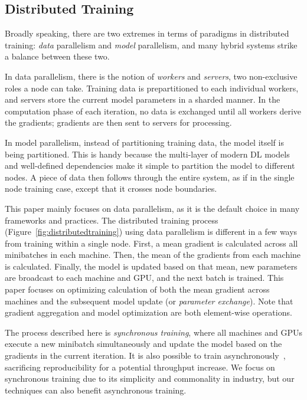 \subsection{Distributed Training}
Broadly speaking, there are two extremes in terms of paradigms in distributed training: \textit{data} parallelism and \textit{model} parallelism, and many hybrid systems strike a balance between these two.

In data parallelism, there is the notion of \textit{workers} and \textit{servers}, two non-exclusive roles a node can take. Training data is prepartitioned to each individual workers, and servers store the current model parameters in a sharded manner. In the computation phase of each iteration, no data is exchanged until all workers derive the gradients; gradients are then sent to servers for processing.

In model parallelism, instead of partitioning training data, the model itself is being partitioned. This is handy because the multi-layer of modern DL models and well-defined dependencies make it simple to partition the model to different nodes. A piece of data then follows through the entire system, as if in the single node training case, except that it crosses node boundaries.

This paper mainly focuses on data parallelism, as it is the default choice in many frameworks and practices. The distributed training process (Figure~\ref{fig:distributedtraining}) using data parallelism is different in a few ways from training within a single node.
First, a mean gradient is calculated across all minibatches in each machine. Then, the mean of the gradients from each machine is calculated. Finally, the model is updated based on that mean, new parameters are broadcast to each machine and GPU, and the next batch is trained. This paper focuses on optimizing calculation of both the mean gradient across machines and the subsequent model update (or \textit{parameter exchange}). Note that gradient aggregation and model optimization are both element-wise operations.


The process described here is \textit{synchronous training}, where all machines and GPUs execute a new minibatch simultaneously and update the model based on the gradients in the current iteration. It is also possible to train asynchronously~\cite{tensorflow,revisitSGD,GeePS,recht2011hogwild,projectAdam,googleDNN}, sacrificing reproducibility for a potential throughput increase. %
We focus on synchronous training due to its simplicity and commonality in industry, but our techniques can also benefit asynchronous training.

